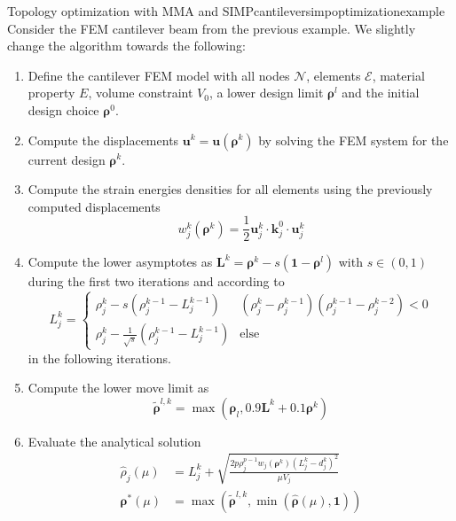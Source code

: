 \begin{example}{Topology optimization with MMA and SIMP}{cantileversimpoptimizationexample}
    Consider the FEM cantilever beam from the previous example. We slightly change the algorithm towards the following:  
    \begin{enumerate}
        \item Define the cantilever FEM model with all nodes $\mathcal{N}$, elements $\mathcal{E}$, material property $E$, volume constraint $V_0$, a lower design limit $\pmb{\rho}^l$ and the initial design choice $\pmb{\rho}^0$.
        \item Compute the displacements $\mathbf{u}^k = \mathbf{u}(\pmb{\rho}^k)$ by solving the FEM system for the current design $\pmb{\rho}^k$.
        \item Compute the strain energies densities for all elements using the previously computed displacements   
        \begin{equation}
            w^k_j(\pmb{\rho}^k) = \frac{1}{2}\mathbf{u}^k_j \cdot \mathbf{k}^0_j \cdot \mathbf{u}^k_j
        \end{equation}
        \item Compute the lower asymptotes as $\mathbf{L}^k =\pmb{\rho}^k - s (\mathbf{1} - \pmb{\rho}^l)$ with $s \in (0,1)$ during the first two iterations and according to 
        \begin{equation}
            L^k_j = 
            \begin{cases}
                \rho^k_j - s  (\rho^{k-1}_j-L^{k-1}_j) & (\rho_j^k-\rho_j^{k-1})(\rho_j^{k-1}-\rho_j^{k-2}) < 0\\
                \rho^k_j - \frac{1}{\sqrt{s}}  (\rho^{k-1}_j-L^{k-1}_j) & \text{else}
            \end{cases}
        \end{equation}
        in the following iterations.
        \item Compute the lower move limit as 
        \begin{equation}
            \tilde{\pmb{\rho}}^{l,k} = \max(\pmb{\rho}_l,  0.9 \mathbf{L}^k + 0.1 \pmb{\rho}^k)
        \end{equation}
        \item Evaluate the analytical solution
            \begin{align}
                \hat{\rho}_j(\mu) &= L_j^k + \sqrt{\frac{2 p \rho_j^{p-1} w_j (\pmb{\rho}^k)
                (L^k_j-d^k_j)^2}{\mu V_j}} \\
                \pmb{\rho}^* (\mu) &= \max\left(\tilde{\pmb{\rho}}^{l,k}, \min \left(\hat{\pmb{\rho}}(\mu), \mathbf{1} \right)\right)

\end{align}
\end{enumerate}
\end{example}
